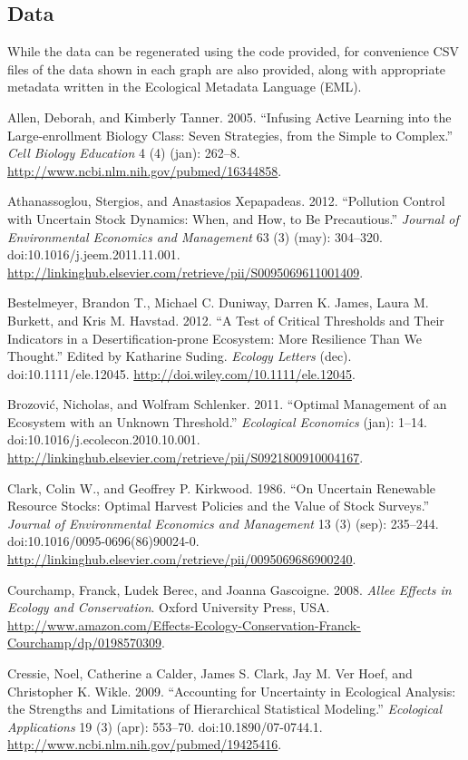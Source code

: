 \documentclass[author-year, review]{elsarticle} %
\begin{document}
\subsection{Data}\label{data}

While the data can be regenerated using the code provided, for
convenience CSV files of the data shown in each graph are also provided,
along with appropriate metadata written in the Ecological Metadata
Language (EML).

Allen, Deborah, and Kimberly Tanner. 2005. ``Infusing Active Learning
into the Large-enrollment Biology Class: Seven Strategies, from the
Simple to Complex.'' \emph{Cell Biology Education} 4 (4) (jan): 262--8.
\url{http://www.ncbi.nlm.nih.gov/pubmed/16344858}.

Athanassoglou, Stergios, and Anastasios Xepapadeas. 2012. ``Pollution
Control with Uncertain Stock Dynamics: When, and How, to Be
Precautious.'' \emph{Journal of Environmental Economics and Management}
63 (3) (may): 304--320. doi:10.1016/j.jeem.2011.11.001.
\url{http://linkinghub.elsevier.com/retrieve/pii/S0095069611001409}.

Bestelmeyer, Brandon T., Michael C. Duniway, Darren K. James, Laura M.
Burkett, and Kris M. Havstad. 2012. ``A Test of Critical Thresholds and
Their Indicators in a Desertification-prone Ecosystem: More Resilience
Than We Thought.'' Edited by Katharine Suding. \emph{Ecology Letters}
(dec). doi:10.1111/ele.12045.
\url{http://doi.wiley.com/10.1111/ele.12045}.

Brozović, Nicholas, and Wolfram Schlenker. 2011. ``Optimal Management of
an Ecosystem with an Unknown Threshold.'' \emph{Ecological Economics}
(jan): 1--14. doi:10.1016/j.ecolecon.2010.10.001.
\url{http://linkinghub.elsevier.com/retrieve/pii/S0921800910004167}.

Clark, Colin W., and Geoffrey P. Kirkwood. 1986. ``On Uncertain
Renewable Resource Stocks: Optimal Harvest Policies and the Value of
Stock Surveys.'' \emph{Journal of Environmental Economics and
Management} 13 (3) (sep): 235--244. doi:10.1016/0095-0696(86)90024-0.
\url{http://linkinghub.elsevier.com/retrieve/pii/0095069686900240}.

Courchamp, Franck, Ludek Berec, and Joanna Gascoigne. 2008. \emph{Allee
Effects in Ecology and Conservation}. Oxford University Press, USA.
\url{http://www.amazon.com/Effects-Ecology-Conservation-Franck-Courchamp/dp/0198570309}.

Cressie, Noel, Catherine a Calder, James S. Clark, Jay M. Ver Hoef, and
Christopher K. Wikle. 2009. ``Accounting for Uncertainty in Ecological
Analysis: the Strengths and Limitations of Hierarchical Statistical
Modeling.'' \emph{Ecological Applications} 19 (3) (apr): 553--70.
doi:10.1890/07-0744.1.
\url{http://www.ncbi.nlm.nih.gov/pubmed/19425416}.
\end{document}
